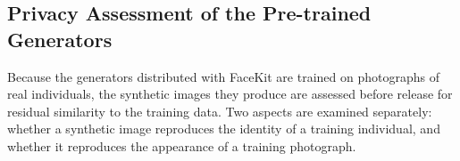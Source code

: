 %
%

\subsection{Privacy Assessment of the Pre-trained Generators}

Because the generators distributed with FaceKit are trained on photographs of
real individuals, the synthetic images they produce are assessed before
release for residual similarity to the training data. Two aspects are examined
separately: whether a synthetic image reproduces the identity of a training
individual, and whether it reproduces the appearance of a training photograph.

